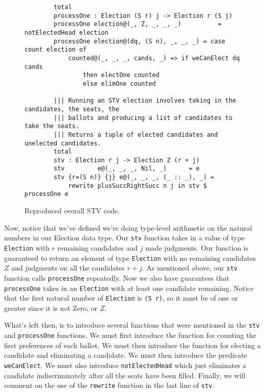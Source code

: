 \begin{figure}[ht!!!!!!!!]
	\caption{Reproduced overall STV code.}
	\label{overall_code2}
	\begin{lstlisting}
        total
        processOne : Election (S r) j -> Election r (S j)
        processOne election@(_, Z, _, _, _)          = notElectedHead election
        processOne election@(dq, (S n), _, _, _) = case count election of
            counted@(_, _, _, cands, _) => if weCanElect dq cands
                then electOne counted
                else elimOne counted

        ||| Running an STV election involves taking in the candidates, the seats, the
        ||| ballots and producing a list of candidates to take the seats. 
        ||| Returns a tuple of elected candidates and unelected candidates.
        total
        stv : Election r j -> Election Z (r + j)
        stv         e@(_, _, _, Nil, _)      = e
        stv {r=(S n)} {j} e@(_, _, _, (_ :: _), _) = 
            rewrite plusSuccRightSucc n j in stv $ processOne e
    \end{lstlisting}
\end{figure}

Now, notice that we've defined we're doing type-level arithmetic on the natural
numbers in our Election data type. Our \texttt{stv} function takes in a value of
type \texttt{Election} with $r$ remaining candidates and $j$ made judgments. Our
function is guaranteed to return an element of type \texttt{Election} with no
remaining candidates $Z$ and judgments on all the candidates $r+j$. As mentioned
above, our \texttt{stv} function calls \texttt{processOne} repeatedly. Now we
also have guarantees that \texttt{processOne} takes in an \texttt{Election} with
at least one candidate remaining. Notice that the first natural number of
\texttt{Election} is \texttt{(S r)}, so it must be of one or greater since it is not
Zero, or $Z$. 

What's left then, is to introduce several functions that were mentioned in the
\texttt{stv} and \texttt{processOne} functions. We must first introduce the
function for counting the first preferences of each ballot. We must then
introduce the function for electing a candidate and eliminating a candidate. We
must then introduce the predicate \texttt{weCanElect}. We must also introduce
\texttt{notElectedHead} which just eliminates a candidate indiscriminately after
all the seats have been filled. Finally, we will comment on the use of the
\texttt{rewrite} function in the last line of \texttt{stv}. 

